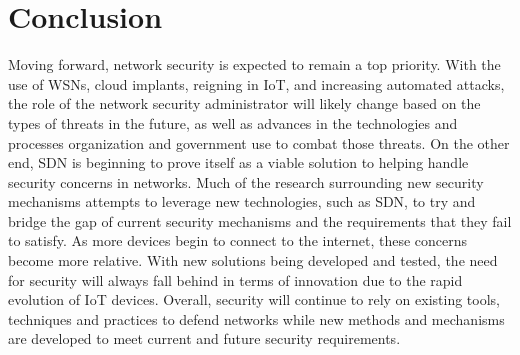 \section {Conclusion}
\smallskip

Moving forward, network security is expected to remain a top priority. With the use of WSNs, cloud implants, reigning in IoT, and increasing automated attacks, the role of the network security administrator will likely change based on the types of threats in the future, as well as advances in the technologies and processes organization and government use to combat those threats. On the other end, SDN is beginning to prove itself as a viable solution to helping handle security concerns in networks. Much of the research surrounding new security mechanisms attempts to leverage new technologies, such as SDN, to try and bridge the gap of current security mechanisms and the requirements that they fail to satisfy. As more devices begin to connect to the internet, these concerns become more relative. With new solutions being developed and tested, the need for security will always fall behind in terms of innovation due to the rapid evolution of IoT devices. Overall, security will continue to rely on existing tools, techniques and practices to defend networks while new methods and mechanisms are developed to meet current and future security requirements.
